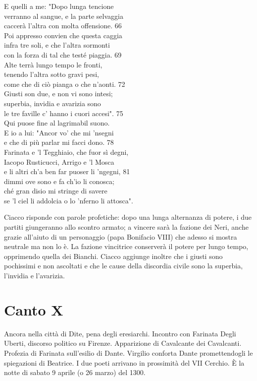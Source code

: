 \documentclass[10pt,a4paper]{article}
\begin{document}
	\begin{estratto}
		E quelli a me: "Dopo lunga tencione\\
		verranno al sangue, e la parte selvaggia\\
		caccerà l’altra con molta offensione.		66\\
		
		Poi appresso convien che questa caggia\\
		infra tre soli, e che l’altra sormonti\\
		con la forza di tal che testé piaggia.		69\\
		
		Alte terrà lungo tempo le fronti,\\
		tenendo l’altra sotto gravi pesi,\\
		come che di ciò pianga o che n’aonti.		72\\
		
		Giusti son due, e non vi sono intesi;\\
		superbia, invidia e avarizia sono\\
		le tre faville c’ hanno i cuori accesi".		75\\
		
		Qui puose fine al lagrimabil suono.\\
		E io a lui: "Ancor vo’ che mi ’nsegni\\
		e che di più parlar mi facci dono.		78\\
		
		Farinata e ’l Tegghiaio, che fuor sì degni,\\
		Iacopo Rusticucci, Arrigo e ’l Mosca\\
		e li altri ch’a ben far puoser li ’ngegni,		81\\
		
		dimmi ove sono e fa ch’io li conosca;\\
		ché gran disio mi stringe di savere\\
		se ’l ciel li addolcia o lo ’nferno li attosca".\\
	\end{estratto}

	Ciacco risponde con parole profetiche: dopo una lunga alternanza di potere, i due partiti giungeranno allo scontro armato; a vincere sarà la fazione dei Neri, anche grazie all’aiuto di un personaggio (papa Bonifacio VIII) che adesso si mostra neutrale ma non lo è. La fazione vincitrice conserverà il potere per lungo tempo, opprimendo quella dei Bianchi. Ciacco aggiunge inoltre che i giusti sono pochissimi e non ascoltati e che le cause della discordia civile sono la superbia, l’invidia e l’avarizia. 
	
	\section{Canto X}
	
	Ancora nella città di Dite, pena degli eresiarchi. Incontro con Farinata Degli Uberti, discorso politico su Firenze. Apparizione di Cavalcante dei Cavalcanti. Profezia di Farinata sull'esilio di Dante. Virgilio conforta Dante promettendogli le spiegazioni di Beatrice. I due poeti arrivano in prossimità del VII Cerchio.
	È la notte di sabato 9 aprile (o 26 marzo) del 1300.
	
\end{document}
